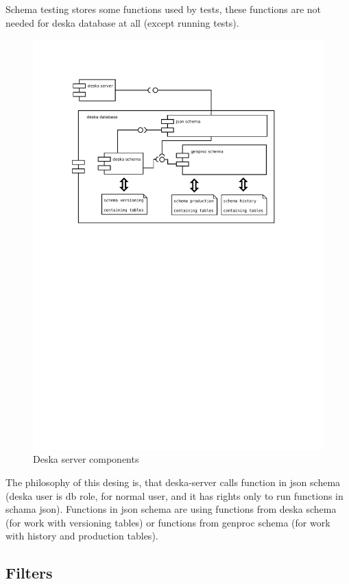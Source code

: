 \documentclass[deska]{subfiles}
\begin{document}
Schema testing stores some functions used by tests, these functions are not needed for deska database at all (except running tests).
\begin{figure}[h]
	\centering
	\includegraphics[trim=28mm 170mm 30mm 28mm]{img-deska-server-components.pdf}
	\caption{Deska server components}
\end{figure}

The philosophy of this desing is, that deska-server calls function in json schema (deska user is db role, for normal user, and it has rights only to run functions in schama json). Functions in json schema are using functions from deska schema (for work with versioning tables) or functions from genproc schema (for work with history and production tables).

\subsection{Filters}
\end{document}
